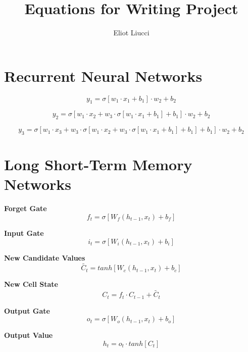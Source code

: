 \documentclass{article}
\title{Equations for Writing Project}
\author{Eliot Liucci}
\begin{document}
\maketitle

\section*{Recurrent Neural Networks}

\begin{equation*}
    y_1 = \sigma[w_1\cdot x_1 + b_1]\cdot w_2 + b_2
\end{equation*}

\begin{equation*}
    y_2 = \sigma[w_1\cdot x_2 + w_3\cdot\sigma[w_1\cdot x_1 + b_1] + b_1]\cdot w_2 + b_2
\end{equation*}

\begin{equation*}
    y_3 = \sigma[w_1\cdot x_3 + w_3\cdot \sigma[w_1\cdot x_2 + w_3\cdot\sigma[w_1\cdot x_1 + b_1] + b_1] + b_1]\cdot w_2 + b_2
\end{equation*}

\section*{Long Short-Term Memory Networks}

\textbf{Forget Gate}\centering
\begin{equation*}
    f_t = \sigma[W_f(h_{t-1}, x_t) + b_f] 
\end{equation*}

\textbf{Input Gate}\centering
\begin{equation*}
    i_t = \sigma[W_i(h_{t-1}, x_t) + b_i] 
\end{equation*}

\textbf{New Candidate Values}
\begin{equation*}
    \tilde{C_t} = tanh[W_c(h_{t-1}, x_t) + b_c]
\end{equation*}

\textbf{New Cell State}
\begin{equation*}
    C_t = f_t\cdot C_{t-1} + \tilde{C_t}
\end{equation*}

\textbf{Output Gate}
\begin{equation*}
    o_t = \sigma[W_o(h_{t-1}, x_t) + b_o]
\end{equation*}

\textbf{Output Value}
\begin{equation*}
    h_t = o_t\cdot tanh[C_t]
\end{equation*}
\end{document}
